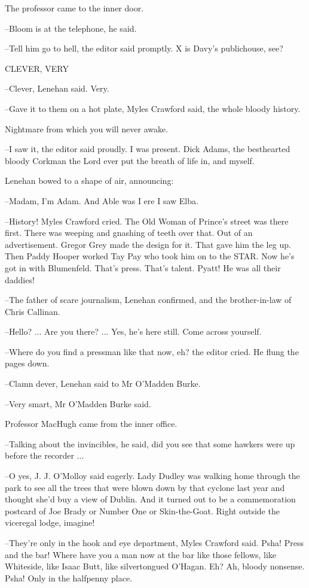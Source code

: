 The professor came to the inner door.

--Bloom is at the telephone, he said.

--Tell him go to hell, the editor said promptly. X is Davy's publichouse,
see?


    CLEVER, VERY


--Clever, Lenehan said. Very.

--Gave it to them on a hot plate, Myles Crawford said, the whole bloody
history.

Nightmare from which you will never awake.

--I saw it, the editor said proudly. I was present. Dick Adams, the
besthearted bloody Corkman the Lord ever put the breath of life in, and
myself.

Lenehan bowed to a shape of air, announcing:

--Madam, I'm Adam. And Able was I ere I saw Elba.

--History! Myles Crawford cried. The Old Woman of Prince's street was
there first. There was weeping and gnashing of teeth over that. Out of an
advertisement. Gregor Grey made the design for it. That gave him the leg
up. Then Paddy Hooper worked Tay Pay who took him on to the STAR.
Now he's got in with Blumenfeld. That's press. That's talent. Pyatt! He
was all their daddies!

--The father of scare journalism, Lenehan confirmed, and the
brother-in-law of Chris Callinan.

--Hello? ... Are you there? ... Yes, he's here still. Come across
yourself.

--Where do you find a pressman like that now, eh? the editor cried.
He flung the pages down.

--Clamn dever, Lenehan said to Mr O'Madden Burke.

--Very smart, Mr O'Madden Burke said.

Professor MacHugh came from the inner office.

--Talking about the invincibles, he said, did you see that some hawkers
were up before the recorder ...

--O yes, J. J. O'Molloy said eagerly. Lady Dudley was walking home
through the park to see all the trees that were blown down by that cyclone
last year and thought she'd buy a view of Dublin. And it turned out to be
a commemoration postcard of Joe Brady or Number One or Skin-the-Goat.
Right outside the viceregal lodge, imagine!

--They're only in the hook and eye department, Myles Crawford said.
Psha! Press and the bar! Where have you a man now at the bar like those
fellows, like Whiteside, like Isaac Butt, like silvertongued O'Hagan. Eh?
Ah, bloody nonsense. Psha! Only in the halfpenny place.

